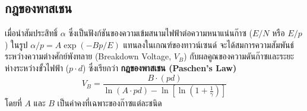 \subsection{กฎของพาสเชน}

เมื่อนำสัมประสิทธิ์ $\alpha$ ซึ่งเป็นฟังก์ชันของความเข้มสนามไฟฟ้าต่อความหนาแน่นก๊าซ ($E/N$ หรือ $E/p$) ในรูป $\alpha/p = A \exp(-B p / E)$ แทนลงในเกณฑ์ของทาวน์เซนด์ จะได้สมการความสัมพันธ์ระหว่างความต่างศักย์พังทลาย (Breakdown Voltage, $V_B$) กับผลคูณของความดันก๊าซและระยะห่างระหว่างขั้วไฟฟ้า ($p \cdot d$) ซึ่งเรียกว่า \textbf{กฎของพาสเชน (Paschen's Law)}
\begin{equation}
    V_B = \frac{B \cdot (p d)}{\ln(A \cdot p d) - \ln\left[\ln\left(1 + \frac{1}{\gamma}\right)\right]}
    \label{eq:paschen_law}
\end{equation}
โดยที่ $A$ และ $B$ เป็นค่าคงที่เฉพาะของก๊าซแต่ละชนิด

